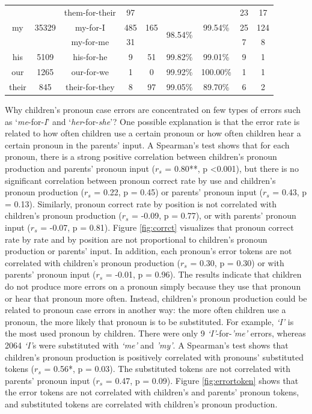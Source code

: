 \begin{table}[h]
\begin{tabular}{c|cccccccc}
 &  & them-for-their & 97 &  &  &  & 23 & 17 \\
my & 35329 & my-for-I & 485 & 165 & \multirow{2}{*}{98.54\%} & 99.54\% & 25 & 124 \\
 &  & my-for-me & 31 &  &  &  & 7 & 8 \\
his & 5109 & his-for-he & 9 & 51 & 99.82\% & 99.01\% & 9 & 1 \\
our & 1265 & our-for-we & 1 & 0 & 99.92\% & 100.00\% & 1 & 1 \\
their & 845 & their-for-they & 8 & 97 & 99.05\% & 89.70\% & 6 & 2\\
\hline
\end{tabular}
\end{table}
\FloatBarrier

Why children's pronoun case errors  are concentrated on few types of errors such as `\textit{me}-for-\textit{I}' and `\textit{her}-for-\textit{she}'? One possible explanation is that the error rate is related to how often children use a certain pronoun or how often children hear a certain pronoun in the parents' input. A Spearman's test shows that for each pronoun, there is a strong positive correlation between children's pronoun production and parents' pronoun input ($r_s$ = 0.80**, p <0.001), but there is no significant correlation between pronoun correct rate by use and children's pronoun production ($r_s$ = 0.22, p = 0.45) or parents' pronoun input ($r_s$ = 0.43, p = 0.13). Similarly, pronoun correct rate by position is not correlated with children's pronoun production ($r_s$ = -0.09, p = 0.77), or with parents' pronoun input ($r_s$ = -0.07, p = 0.81). Figure \ref{fig:corrct} visualizes that pronoun correct rate by rate and by position are not proportional to children's pronoun production or parents' input. In addition, each pronoun's error tokens are not correlated with children's pronoun production ($r_s$ = 0.30, p = 0.30) or with parents' pronoun input ($r_s$ = -0.01, p = 0.96). The results indicate that children do not produce more errors on a pronoun simply because they use that pronoun or hear that pronoun more often. Instead, children's pronoun production could be related to pronoun case errors in another way: the more often children use a pronoun, the more likely that pronoun is to be substituted. For example, \textit{`I'} is the most used pronoun by children. There were only 9 \textit{`I'}-for-\textit{'me'} errors, whereas 2064 \textit{`I'}s were substituted with \textit{`me'} and \textit{'my'}. A Spearman's test shows that children's pronoun production is positively correlated with pronouns' substituted tokens ($r_s$ = 0.56*, p = 0.03). The substituted tokens are not correlated with parents' pronoun input ($r_s$ = 0.47, p = 0.09). Figure \ref{fig:errortoken} shows that the error tokens are not correlated with children's and parents' pronoun tokens, and substituted tokens are correlated with children's pronoun production.



